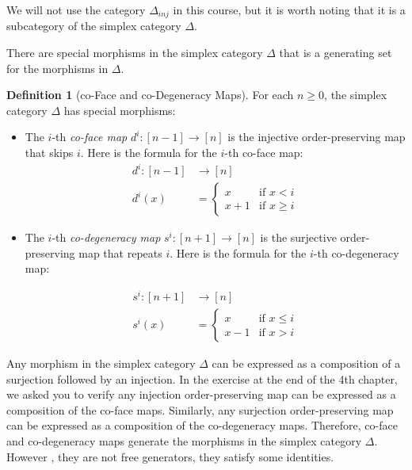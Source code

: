 \documentclass[11pt]{article}
\theoremstyle{definition}
\newtheorem{definition}{Definition}[section]
\theoremstyle{plain}
\begin{document}
We will not use the category $\Delta_{inj}$ in this course, but it is worth noting that it is a subcategory of the simplex category $\Delta$.



There are special morphisms in the simplex category $\Delta$ that is a generating set for the morphisms in $\Delta$.

\begin{definition}[co-Face and co-Degeneracy Maps]
    For each $n \geq 0$, the simplex category $\Delta$ has special morphisms:
    \begin{itemize}
        \item The $i$-th \emph{co-face map} $d^i : [n-1] \to [n]$ is the injective order-preserving map that skips $i$. Here is the formula for the $i$-th co-face map:
              \begin{align*}
                  d^i : [n-1] & \to [n] \\
                  d^i(x)      & =
                  \begin{cases}
                      x     & \text{if } x < i    \\
                      x + 1 & \text{if } x \geq i
                  \end{cases}
              \end{align*}

        \item The $i$-th \emph{co-degeneracy map} $s^i : [n+1] \to [n]$ is the surjective order-preserving map that repeats $i$. Here is the formula for the $i$-th co-degeneracy map:

              \begin{align*}
                  s^i : [n+1] & \to [n] \\
                  s^i(x)      & =
                  \begin{cases}
                      x     & \text{if } x \leq i \\
                      x - 1 & \text{if } x > i
                  \end{cases}
              \end{align*}

    \end{itemize}


\end{definition}
Any morphism in the simplex category $\Delta$ can be expressed as a composition of a surjection followed by an injection. In the exercise at the end of the 4th chapter, we asked you to verify any injection order-preserving map can be expressed as a composition of the co-face maps.
Similarly, any surjection order-preserving map can be expressed as a composition of the co-degeneracy maps. Therefore, co-face and co-degeneracy maps generate the morphisms in the simplex category $\Delta$.
However , they are not free generators, they satisfy some identities.
\end{document}
